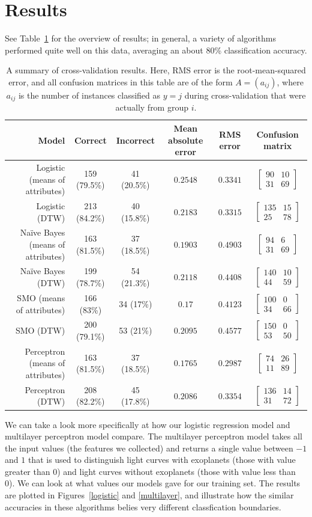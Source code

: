 \documentclass{amsart}
\newcommand{\mat}[4]{\begin{bmatrix} {#1} & {#2}\\{#3} & {#4}\end{bmatrix}}
\begin{document}
\section{Results}
See Table~\ref{resultstable} for the overview of results; in general, a variety of algorithms performed quite well on this data, averaging an about 80\% classification accuracy.
\begin{table}[!ht]
	\label{resultstable}
	\begin{tabular}{r|c c c c c}
	Model & Correct & Incorrect & Mean absolute error & RMS error & Confusion matrix\\
	\hline
	Logistic (means of attributes) & 159 (79.5\%) & 41 (20.5\%) & $0.2548$ & $0.3341$ & $\mat{90}{10}{31}{69}$\\
	Logistic (DTW) & 213 (84.2\%) & 40 (15.8\%) & $0.2183$ & $0.3315$ & $\mat{135}{15}{25}{78}$\\
	Na\"ive Bayes (means of attributes) & 163 (81.5\%) & 37 (18.5\%) & $0.1903$ & $0.4903$ & $\mat{94}{6}{31}{69}$\\
	Na\"ive Bayes (DTW) & 199 (78.7\%) & 54 (21.3\%) & $0.2118$ & $0.4408$ & $\mat{140}{10}{44}{59}$\\
	SMO (means of attributes) & 166 (83\%) & 34 (17\%) & $0.17$ & $0.4123$ & $\mat{100}{0}{34}{66}$\\
	SMO (DTW) & 200 (79.1\%) & 53 (21\%) & $0.2095$ & $0.4577$ & $\mat{150}{0}{53}{50}$\\
	Perceptron (means of attributes) & 163 (81.5\%) & 37 (18.5\%) & $0.1765$ & $0.2987$ & $\mat{74}{26}{11}{89}$\\
	Perceptron (DTW) & 208 (82.2\%) & 45 (17.8\%) & $0.2086$ & $0.3354$ & $\mat{136}{14}{31}{72}$
	\end{tabular}
	\caption{A summary of cross-validation results. Here, RMS error is the root-mean-squared error, and all confusion matrices in this table are of the form $A = (a_{ij})$, where $a_{ij}$ is the number of instances classified as $y = j$ during cross-validation that were actually from group $i$.}
\end{table}
We can take a look more specifically at how our logistic regression model and multilayer perceptron model compare. The multilayer perceptron model takes all the input values (the features we collected) and returns a single value between $-1$ and $1$ that is used to distinguish light curves with exoplanets (those with value greater than 0) and light curves without exoplanets (those with value less than 0). We can look at what values our models gave for our training set. The results are plotted in Figures~\ref{logistic} and \ref{multilayer}, and illustrate how the similar accuracies in these algorithms belies very different classfication boundaries.
\end{document}
